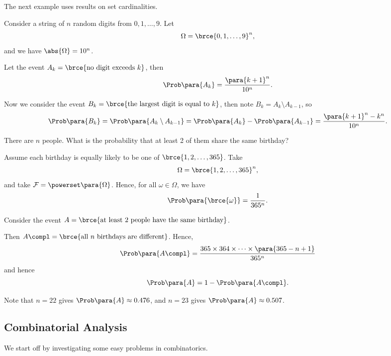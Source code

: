 The next example uses results on set cardinalities.

\begin{example}
    \label{ex:largest-digit}%
    Consider a string of \(n\) random digits from \(0, 1, \ldots, 9\). Let
    \[
        \Omega = \brce{0, 1, \ldots, 9}^n,
    \]
    and we have \(\abs{\Omega} = 10^n\).

    Let the event \(A_k = \brce{\text{no digit exceeds }k}\), then
    \[
        \Prob\para{A_k} = \frac{\para{k + 1}^{n}}{10^n}.
    \]

    Now we consider the event \(B_k = \brce{\text{the largest digit is equal to }k}\), then note \(B_k = A_k \setminus A_{k - 1}\), so
    \[
        \Prob\para{B_k} = \Prob\para{A_k \setminus A_{k - 1}} = \Prob\para{A_k} - \Prob\para{A_{k - 1}} = \frac{\para{k + 1}^n - k^n}{10^n}.
    \]
\end{example}

\begin{example}
    \label{ex:birthbay-problem}%
    There are \(n\) people. What is the probability that at least 2 of them share the same birthday?
        
    Assume each birthday is equally likely to be one of \(\brce{1, 2, \ldots, 365}\). Take
    \[
        \Omega = \brce{1, 2, \ldots, 365}^n,
    \]
    and take \(\mathcal{F} = \powerset\para{\Omega}\). Hence, for all \(\omega \in \Omega\), we have
    \[
        \Prob\para{\brce{\omega}} = \frac{1}{365^n}.
    \]

    Consider the event \(A = \brce{\text{at least 2 people have the same birthday}}\).

    Then \(A\compl = \brce{\text{all }n\text{ birthdays are different}}\). Hence,
    \[
        \Prob\para{A\compl} = \frac{365 \times 364 \times \cdots \times \para{365 - n + 1}}{365^n}
    \]
    and hence
    \[
        \Prob\para{A} = 1 - \Prob\para{A\compl}.
    \]

    Note that \(n = 22\) gives \(\Prob\para{A} \approx 0.476\), and \(n = 23\) gives \(\Prob\para{A} \approx 0.507\).
\end{example}

\subsection{Combinatorial Analysis}
We start off by investigating some easy problems in combinatorics.

